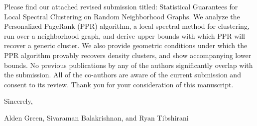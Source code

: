 \documentclass{article}
\begin{document}
Please find our attached revised submission titled: Statistical Guarantees for Local Spectral Clustering on Random Neighborhood Graphs. We analyze the Personalized PageRank (PPR) algorithm, a local spectral method for clustering, run over a neighborhood graph, and derive upper bounds with which PPR will recover a generic cluster. We also provide geometric conditions under which the PPR algorithm provably recovers density clusters, and show accompanying lower bounds. No previous publications by any of the authors significantly overlap with the submission. All of the co-authors are aware of the current submission and consent to its review. Thank you for your consideration of this manuscript.

\vspace{.2 in}

Sincerely,

\vspace{.1 in}
Alden Green, Sivaraman Balakrishnan, and Ryan Tibshirani
	
	
	
\end{document}
